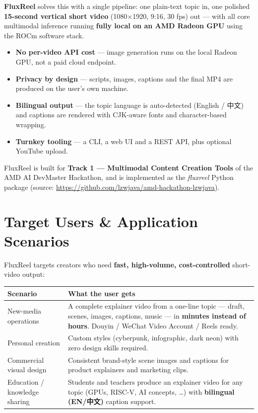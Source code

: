 \documentclass[UTF8,fontset=mac,a4paper,11pt]{ctexart}
\begin{document}
\textbf{FluxReel} solves this with a single pipeline:
one plain-text topic in, one polished \textbf{15-second vertical short
video} (1080×1920, 9:16, 30 fps) out --- with all core multimodal inference
running \textbf{fully local on an AMD Radeon GPU} using the ROCm software
stack.

\begin{itemize}
  \item \textbf{No per-video API cost} --- image generation runs on the
        local Radeon GPU, not a paid cloud endpoint.
  \item \textbf{Privacy by design} --- scripts, images, captions and the
        final MP4 are produced on the user's own machine.
  \item \textbf{Bilingual output} --- the topic language is auto-detected
        (English / 中文) and captions are rendered with CJK-aware fonts
        and character-based wrapping.
  \item \textbf{Turnkey tooling} --- a CLI, a web UI and a REST API, plus
        optional YouTube upload.
\end{itemize}

FluxReel is built for \textbf{Track 1 --- Multimodal Content Creation
Tools} of the AMD AI DevMaster Hackathon, and is implemented as the
\emph{fluxreel} Python package (source:
\url{https://github.com/lzwjava/amd-hackathon-lzwjava}).

\section{Target Users \& Application Scenarios}

FluxReel targets creators who need \textbf{fast, high-volume,
cost-controlled} short-video output:

\begin{table}[h]
  \centering
  \begin{tabularx}{\textwidth}{@{}l X@{}}
    \toprule
    \textbf{Scenario} & \textbf{What the user gets} \\
    \midrule
    New-media operations
      & A complete explainer video from a one-line topic --- draft, scenes,
        images, captions, music --- in \textbf{minutes instead of hours}.
        Douyin / WeChat Video Account / Reels ready. \\
    Personal creation
      & Custom styles (cyberpunk, infographic, dark neon) with zero design
        skills required. \\
    Commercial visual design
      & Consistent brand-style scene images and captions for product
        explainers and marketing clips. \\
    Education / knowledge sharing
      & Students and teachers produce an explainer video for any topic
        (GPUs, RISC-V, AI concepts, \dots) with \textbf{bilingual
        (EN/中文)} caption support. \\
    \bottomrule
  \end{tabularx}
\end{table}
\end{document}
